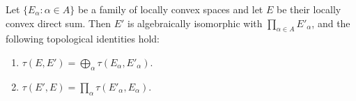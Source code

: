 Let $\{E_\alpha : \alpha \in A\}$ be a family of locally convex spaces and let $E$ be their locally convex direct sum. Then $E'$ is algebraically isomorphic with $\prod_{\alpha \in A} E'_\alpha$, and the following topological identities hold:
\begin{enumerate}
\item $\tau(E, E') = \bigoplus_{\alpha} \tau(E_\alpha, E'_\alpha)$.
\item $\tau(E', E) = \prod_{\alpha} \tau(E'_\alpha, E_\alpha)$.
\end{enumerate}
